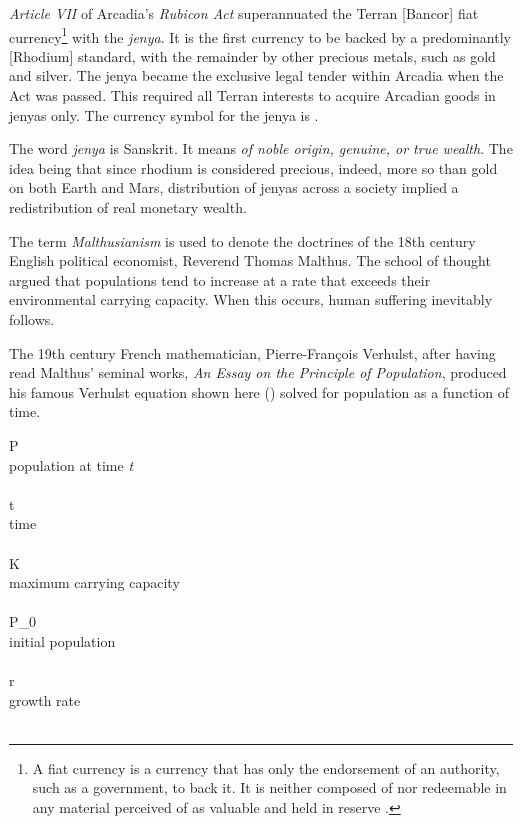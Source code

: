 {\it Article VII} of Arcadia's {\it Rubicon Act} superannuated the Terran [Bancor] fiat currency\footnote{A fiat currency is a currency that has only the endorsement of an authority, such as a government, to back it. It is neither composed of nor redeemable in any material perceived of as valuable and held in reserve .} with the {\it jenya}. It is the first currency to be backed by a predominantly [Rhodium] standard, with the remainder by other precious metals, such as gold and silver. The jenya became the exclusive legal tender within Arcadia when the Act was passed. This required all Terran interests to acquire Arcadian goods in jenyas only. The currency symbol for the jenya is .

    {}

The word {\it jenya} is Sanskrit. It means {\it of noble origin, genuine, or true wealth}. The idea being that since rhodium is considered precious, indeed, more so than gold on both Earth and Mars, distribution of jenyas across a society implied a redistribution of real monetary wealth.
\stopdefinition

The term {\it Malthusianism} is used to denote the doctrines of the 18th century English political economist, Reverend Thomas Malthus. The school of thought argued that populations tend to increase at a rate that exceeds their environmental carrying capacity. When this occurs, human suffering inevitably follows. 

The 19th century French mathematician, Pierre-François Verhulst, after having read Malthus' seminal works, {\it An Essay on the Principle of Population}, produced his famous Verhulst equation shown here () solved for population as a function of time.
\crlf

\startformula
{}
\stopformula
\startlegend
\leg P \\ population at time {\it t} \\ \\
\leg t \\ time \\ \\
\leg K \\ maximum carrying capacity \\ \\
\leg P_0 \\ initial population \\ \\
\leg r \\ growth rate \\ \\
\stoplegend
\crlf

